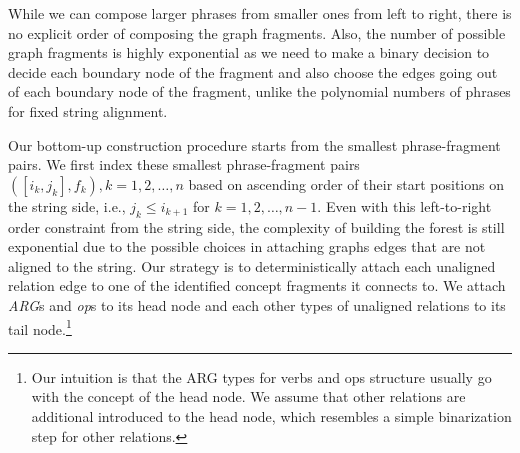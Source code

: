 While we can compose larger 
phrases from smaller ones from left to right, there is no explicit order of composing the graph fragments. Also, the number of possible 
graph fragments is highly exponential as we need to make a binary decision to decide each boundary node of the fragment and 
also choose the edges going out of each boundary node of the fragment, unlike the polynomial numbers of phrases for fixed string alignment.


Our bottom-up construction procedure starts from the 
smallest phrase-fragment pairs.
We first index these smallest phrase-fragment pairs $([i_k, j_k], f_k), k = 1, 2, \ldots, n$ based on ascending order of their start positions 
on the string side, i.e., 
$j_k \leq i_{k+1}$ for $k = 1, 2, \ldots, n-1$. Even with this left-to-right order constraint from the string side, the complexity of
building the forest is still exponential due to the 
possible choices in attaching graphs edges that are not aligned to the string. 
Our strategy
is to deterministically attach each unaligned relation edge to one of the identified concept 
fragments it connects to. We attach {\em ARG}s and {\em op}s to its head
node and each other types of unaligned relations to its tail node.\footnote{Our intuition is that the ARG types for verbs and ops structure
usually go with the concept of the head node. We assume that other relations are additional introduced to the head node, which resembles
a simple binarization step for other relations.}

